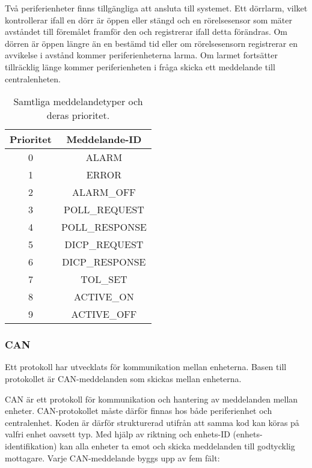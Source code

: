 \documentclass[a4paper]{article}
\begin{document}
Två periferienheter finns tillgängliga att ansluta till systemet.
Ett dörrlarm, vilket kontrollerar ifall en dörr är öppen eller stängd och en rörelsesensor som mäter avståndet till föremålet framför den och registrerar ifall detta förändras.
Om dörren är öppen längre än en bestämd tid eller om rörelsesensorn registrerar en avvikelse i avstånd kommer periferienheterna larma.
Om larmet fortsätter tillräcklig länge kommer periferienheten i fråga skicka ett meddelande till centralenheten.

\begin{table}[H]
  \centering
  \begin{tabular}{|c|c|}\hline
    Prioritet & Meddelande-ID \\\hline
    0 & ALARM \\\hline
    1 & ERROR \\\hline
	2 & ALARM\_OFF \\\hline
	3 & POLL\_REQUEST \\\hline
	4 & POLL\_RESPONSE \\\hline
    5 & DICP\_REQUEST \\\hline
    6 & DICP\_RESPONSE \\\hline
    7 & TOL\_SET \\\hline
    8 & ACTIVE\_ON \\\hline
    9 & ACTIVE\_OFF \\\hline
  \end{tabular}
  \caption{Samtliga meddelandetyper och deras prioritet.}
  \label{tab:meddelandetyper}
\end{table}


\subsubsection{CAN}
Ett protokoll har utvecklats för kommunikation mellan enheterna.
Basen till protokollet är CAN-meddelanden som skickas mellan enheterna.

CAN är ett protokoll för kommunikation och hantering av meddelanden mellan enheter.
CAN-protokollet måste därför finnas hos både periferienhet och centralenhet.
Koden är därför strukturerad utifrån att samma kod kan köras på valfri enhet oavsett typ.
Med hjälp av riktning och enhets-ID (enhets-identifikation) kan alla enheter ta emot och skicka meddelanden till godtycklig mottagare.
Varje CAN-meddelande byggs upp av fem fält:
\end{document}
